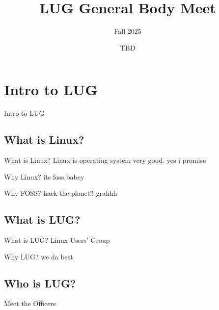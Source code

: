\documentclass{beamer}
\title{LUG General Body Meet}
\subtitle{Fall 2025}
\date{TBD}
\institute{Linux Users Group @ UIC}
\begin{document}
  \begin{frame}
    \maketitle
  \end{frame}

  \begin{frame}
    \tableofcontents
  \end{frame}
  
  \section{Intro to LUG}
  \begin{frame}

    {\Huge Intro to LUG}
  \end{frame}

  \subsection{What is Linux?}
  \begin{frame}{What is Linux?}
    Linux is operating system very good. yes i promise
  \end{frame}

  \begin{frame}{Why Linux?}
    its foss babey
  \end{frame}
  
  \begin{frame}{Why FOSS?}
    hack the planet!! grahhh
  \end{frame}

  \subsection{What is LUG?}
  \begin{frame}{What is LUG?}
    Linux Users' Group
  \end{frame}

  \begin{frame}{Why LUG?}
    we da best
  \end{frame}

  \subsection{Who is LUG?}
  \begin{frame}
    
    {\Huge Meet the Officers}
  \end{frame}
\end{document}
